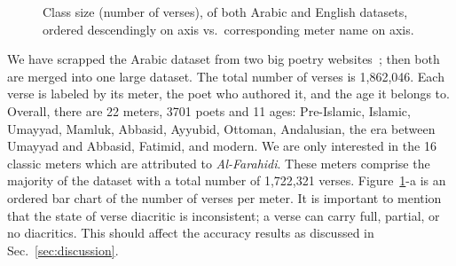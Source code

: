 \documentclass[journal,10pt,twocolumns,letter]{IEEEtran}
\begin{document}
\begin{figure}[!tb]
\caption{\footnotesize Class size (number of verses), of both Arabic and English datasets, ordered
    descendingly on  axis vs.\ corresponding meter name on 
    axis.}\label{fig:footn-footn-class}
\end{figure}

We have scrapped the Arabic dataset from two big poetry websites~\citep{diwan,
  PoetryEncyclopedia2016}; then both are merged into one large dataset. The total number of verses
is 1,862,046. Each verse is labeled by its meter, the poet who authored it, and the age it belongs
to. Overall, there are 22 meters, 3701 poets and 11 ages: Pre-Islamic, Islamic, Umayyad, Mamluk,
Abbasid, Ayyubid, Ottoman, Andalusian, the era between Umayyad and Abbasid, Fatimid, and modern. We
are only interested in the 16 classic meters which are attributed to \textit{Al-Farahidi}. These
meters comprise the majority of the dataset with a total number of 1,722,321
verses. Figure~\ref{fig:footn-footn-class}-a is an ordered bar chart of the number of verses per
meter. It is important to mention that the state of verse diacritic is inconsistent; a verse can
carry full, partial, or no diacritics. This should affect the accuracy results as discussed in
Sec.~\ref{sec:discussion}.
\end{document}
